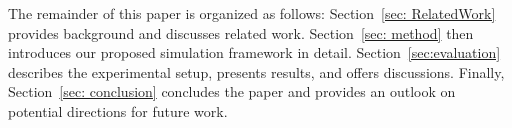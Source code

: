 The remainder of this paper is organized as follows: 
Section~\ref{sec: RelatedWork} provides background and discusses related work. 
Section~\ref{sec: method} then introduces our proposed simulation framework in detail. 
Section~\ref{sec:evaluation} describes the experimental setup, presents results, and offers discussions. 
Finally, Section~\ref{sec: conclusion} concludes the paper and provides an outlook on potential directions for future work.

